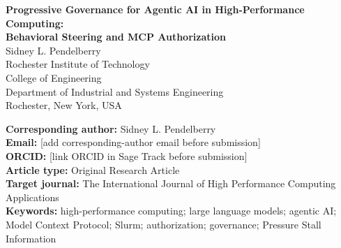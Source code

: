 \documentclass[11pt]{article}
\begin{document}
\thispagestyle{empty}
\begin{center}
{\LARGE\bfseries Progressive Governance for Agentic AI in High-Performance Computing:\\[0.4em]
Behavioral Steering and MCP Authorization}\\[2em]
{\large Sidney L. Pendelberry}\\[0.7em]
Rochester Institute of Technology\\
College of Engineering\\
Department of Industrial and Systems Engineering\\
Rochester, New York, USA\\[2em]
\end{center}
\noindent\textbf{Corresponding author:} Sidney L. Pendelberry\\
\textbf{Email:} [add corresponding-author email before submission]\\
\textbf{ORCID:} [link ORCID in Sage Track before submission]\\[1.5em]
\noindent\textbf{Article type:} Original Research Article\\
\textbf{Target journal:} The International Journal of High Performance Computing Applications\\[1.5em]
\noindent\textbf{Keywords:} high-performance computing; large language models; agentic AI; Model Context Protocol; Slurm; authorization; governance; Pressure Stall Information
\end{document}
